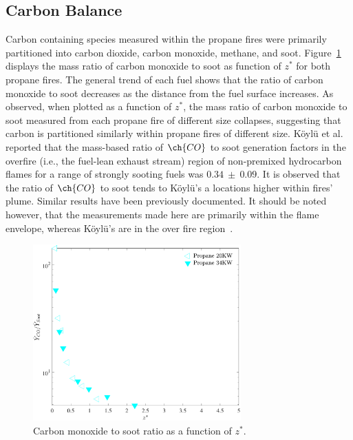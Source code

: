 \documentclass[12pt]{ussci}
\begin{document}
\subsection{Carbon Balance}
Carbon containing species measured within the propane fires were primarily partitioned into carbon dioxide, carbon monoxide, methane, and soot. Figure~\ref{fig:C2S} displays the mass ratio of carbon monoxide to soot as function of $z^*$ for both propane fires.  The general trend of each fuel shows that the ratio of carbon monoxide to soot decreases as the distance from the fuel surface increases. As observed, when plotted as a function of $z^*$, the mass ratio of carbon monoxide to soot measured from each propane fire of different size collapses, suggesting that carbon is partitioned similarly within propane fires of different size. K\"{o}yl\"{u} et al.~\cite{koylu1991} reported that the mass-based ratio of $\ch{CO}$ to soot generation factors in the overfire (i.e., the fuel-lean exhaust stream) region of non-premixed hydrocarbon flames for a range of strongly sooting fuels was $0.34~\pm~0.09$. It is observed that the ratio of $\ch{CO}$ to soot tends to K\"{o}yl\"{u}'s a locations higher within fires' plume. Similar results have been previously documented. It should be noted however, that the measurements made here are primarily within the flame envelope, whereas K\"{o}yl\"{u}'s are in the over fire region~\cite{koylu1991}.
\begin{figure}[h!]
	\centering
\includegraphics[width=8cm, keepaspectratio]{CO_Soot.pdf}
	\caption[Carbon monoxide to soot ratio as a function of mixture fraction]{Carbon monoxide to soot ratio as a function of $z^*$.}
	\label{fig:C2S}
\end{figure}
\end{document}
